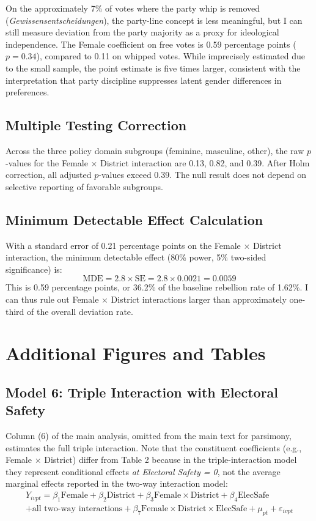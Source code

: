 \documentclass[12pt]{article}
\begin{document}
On the approximately 7\% of votes where the party whip is removed (\textit{Gewissensentscheidungen}), the party-line concept is less meaningful, but I can still measure deviation from the party majority as a proxy for ideological independence. The Female coefficient on free votes is 0.59 percentage points ($p = 0.34$), compared to 0.11 on whipped votes. While imprecisely estimated due to the small sample, the point estimate is five times larger, consistent with the interpretation that party discipline suppresses latent gender differences in preferences.

\subsection{Multiple Testing Correction}

Across the three policy domain subgroups (feminine, masculine, other), the raw $p$-values for the Female $\times$ District interaction are 0.13, 0.82, and 0.39. After Holm correction, all adjusted $p$-values exceed 0.39. The null result does not depend on selective reporting of favorable subgroups.

\subsection{Minimum Detectable Effect Calculation}

With a standard error of 0.21 percentage points on the Female $\times$ District interaction, the minimum detectable effect (80\% power, 5\% two-sided significance) is:
\[
\text{MDE} = 2.8 \times \text{SE} = 2.8 \times 0.0021 = 0.0059
\]
This is 0.59 percentage points, or 36.2\% of the baseline rebellion rate of 1.62\%. I can thus rule out Female $\times$ District interactions larger than approximately one-third of the overall deviation rate.


\section{Additional Figures and Tables}\label{app:additional}

\subsection{Model 6: Triple Interaction with Electoral Safety}

Column (6) of the main analysis, omitted from the main text for parsimony, estimates the full triple interaction. Note that the constituent coefficients (e.g., Female $\times$ District) differ from Table 2 because in the triple-interaction model they represent conditional effects \textit{at Electoral Safety = 0}, not the average marginal effects reported in the two-way interaction model:
\begin{multline}
Y_{ivpt} = \beta_1 \text{Female} + \beta_2 \text{District} + \beta_3 \text{Female} \times \text{District} + \beta_4 \text{ElecSafe} \\
+ \text{all two-way interactions} + \beta_7 \text{Female} \times \text{District} \times \text{ElecSafe} + \mu_{pt} + \varepsilon_{ivpt}
\end{multline}
\end{document}
